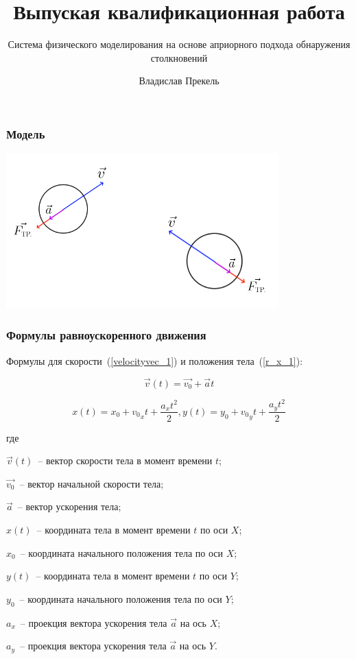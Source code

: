 \documentclass[xetex,aspectratio=43]{beamer}
\title{Выпуская квалификационная работа}
\subtitle{Система физического моделирования на основе априорного подхода обнаружения столкновений}
\author{Владислав Прекель}
\institute{ИКИТ СФУ\par КИ18-16б}
\date{Красноярск\par 20 июня 2022 г.}
\newenvironment{Underequation}{
    \small
    \noindent
    где
    \hspace{-1.45ex}
    \setlength{\parindent}{3.5ex}
}{}
\begin{document}
\begin{frame}
    \titlepage
\end{frame}

\begin{frame}
    \frametitle{Модель}

    \includegraphics[height=6cm]{body_init}

\end{frame}

\begin{frame}
    \frametitle{Формулы равноускоренного движения}
    Формулы для скорости~(\ref{velocityvec_1}) и положения тела~(\ref{r_x_1}):

    \begin{equation}\label{velocityvec_1}
        \vec{v}(t) = \vec{v_0} + \vec{a}t
    \end{equation}

    \begin{equation}\label{r_x_1}
        x(t) = x_0 + {v_0}_x t + \frac{a_x t^2}{2},
        y(t) = y_0 + {v_0}_y t + \frac{a_y t^2}{2}
    \end{equation}


    \begin{Underequation}
        \(\vec{v}(t)\)~-- вектор скорости тела в момент времени \(t\);

        \(\vec{v_0}\)~-- вектор начальной скорости тела;

        \(\vec{a}\)~-- вектор ускорения тела;

        \(x(t)\)~-- координата тела в момент времени \(t\) по оси \(X\);

        \(x_0\)~-- координата начального положения тела по оси \(X\);

        \(y(t)\)~-- координата тела в момент времени \(t\) по оси \(Y\);

        \(y_0\)~-- координата начального положения тела по оси \(Y\);

        \(a_x\)~-- проекция вектора ускорения тела \(\vec{a}\) на ось \(X\);

        \(a_y\)~-- проекция вектора ускорения тела \(\vec{a}\) на ось \(Y\).
    \end{Underequation}
\end{frame}
\end{document}
